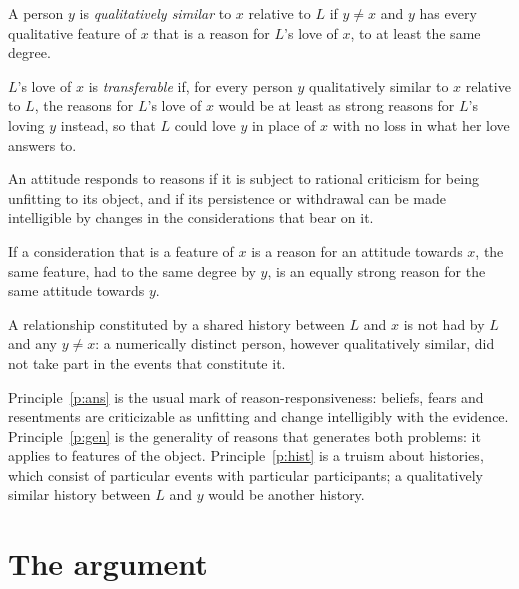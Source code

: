 \documentclass{situationist-preprint}
\begin{document}
\begin{definition}\label{d:sim}
A person $y$ is \emph{qualitatively similar} to $x$ relative to $L$ if $y \neq x$ and $y$ has every qualitative feature of $x$ that is a reason for $L$'s love of $x$, to at least the same degree.
\end{definition}

\begin{definition}[Transferability]\label{d:trans}
$L$'s love of $x$ is \emph{transferable} if, for every person $y$ qualitatively similar to $x$ relative to $L$, the reasons for $L$'s love of $x$ would be at least as strong reasons for $L$'s loving $y$ instead, so that $L$ could love $y$ in place of $x$ with no loss in what her love answers to.
\end{definition}

\begin{principle}[Answerability]\label{p:ans}
An attitude responds to reasons if it is subject to rational criticism for being unfitting to its object, and if its persistence or withdrawal can be made intelligible by changes in the considerations that bear on it.
\end{principle}

\begin{principle}[Generality]\label{p:gen}
If a consideration that is a feature of $x$ is a reason for an attitude towards $x$, the same feature, had to the same degree by $y$, is an equally strong reason for the same attitude towards $y$.
\end{principle}

\begin{principle}\label{p:hist}
A relationship constituted by a shared history between $L$ and $x$ is not had by $L$ and any $y \neq x$: a numerically distinct person, however qualitatively similar, did not take part in the events that constitute it.
\end{principle}

Principle~\ref{p:ans} is the usual mark of reason-responsiveness: beliefs, fears and resentments are criticizable as unfitting and change intelligibly with the evidence. Principle~\ref{p:gen} is the generality of reasons that generates both problems: it applies to features of the object. Principle~\ref{p:hist} is a truism about histories, which consist of particular events with particular participants; a qualitatively similar history between $L$ and $y$ would be another history.

\section{The argument}
\end{document}
